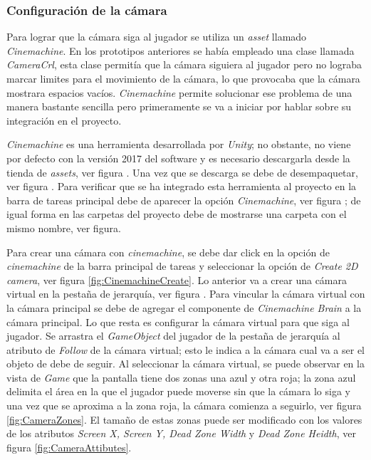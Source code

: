 \subsubsection{Configuración de la cámara}
Para lograr que la cámara siga al jugador se utiliza un \textit{asset} llamado 
\textit{Cinemachine}. En los prototipos anteriores se había empleado una clase 
llamada \textit{CameraCrl}, esta clase permitía que la cámara siguiera al 
jugador pero no lograba marcar limites para el movimiento de la cámara, lo que 
provocaba que la cámara mostrara espacios vacíos. \textit{Cinemachine} permite 
solucionar ese problema de una manera bastante sencilla pero primeramente se va 
a iniciar por hablar sobre su integración en el proyecto.
\\
\par
\textit{Cinemachine} es una herramienta desarrollada por \textit{Unity}; no obstante, no viene por defecto con la versión 2017 del software y es necesario descargarla desde la tienda de \textit{assets}, ver figura . Una vez que se descarga se debe de desempaquetar, ver figura . Para verificar que se ha integrado esta herramienta al proyecto en la barra de tareas principal debe de aparecer la opción \textit{Cinemachine}, ver figura ; de igual forma en las carpetas del proyecto debe de mostrarse una carpeta con el mismo nombre, ver figura. 
\\
\par
Para crear una cámara con \textit{cinemachine}, se debe dar click en la opción de \textit{cinemachine} de la barra principal de tareas y seleccionar la opción de \textit{Create 2D camera}, ver figura \ref{fig:CinemachineCreate}. Lo anterior va a crear una cámara virtual en la pestaña de jerarquía, ver figura . Para vincular la cámara virtual con la cámara principal se debe de agregar el componente de \textit{Cinemachine Brain} a la cámara principal. Lo que resta es configurar la cámara virtual para que siga al jugador. Se arrastra el \textit{GameObject} del jugador de la pestaña de jerarquía al atributo de \textit{Follow} de la cámara virtual; esto le indica a la cámara cual va a ser el objeto de debe de seguir. Al seleccionar la cámara virtual, se puede observar en la vista de \textit{Game} que la pantalla tiene dos zonas una azul y otra roja; la zona azul delimita el área en la que el jugador puede moverse sin que la cámara lo siga y una vez que se aproxima a la zona roja, la cámara comienza a seguirlo, ver figura \ref{fig:CameraZones}. El tamaño de estas zonas puede ser modificado con los valores de los atributos \textit{Screen X, Screen Y, Dead Zone Width} y \textit{Dead Zone Heidth}, ver figura \ref{fig:CameraAttibutes}. 
